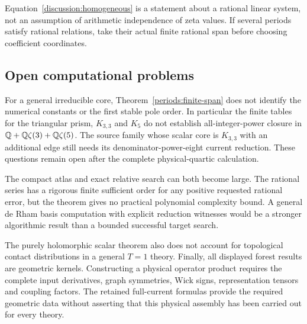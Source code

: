 Equation~\eqref{discussion:homogeneous} is a statement about a
rational linear system, not an assumption of arithmetic
independence of zeta values. If several periods satisfy rational
relations, take their actual finite rational span before choosing
coefficient coordinates.

\subsection{Open computational problems}

For a general irreducible core, Theorem~\ref{periods:finite-span}
does not identify the numerical constants or the first stable
pole order. In particular the finite tables for the triangular
prism, $K_{3,3}$ and $K_5$ do not establish all-integer-power
closure in $\mathbb{Q}+\mathbb{Q}\zeta(3)+\mathbb{Q}\zeta(5)$. The source family whose
scalar core is $K_{3,3}$ with an additional edge still needs its
denominator-power-eight current reduction. These questions remain
open after the complete physical-quartic calculation.

The compact atlas and exact relative search can both become
large. The rational series has a rigorous finite sufficient order
for any positive requested rational error, but the theorem gives
no practical polynomial complexity bound. A general de Rham
basis computation with explicit reduction witnesses would be a
stronger algorithmic result than a bounded successful target
search.

The purely holomorphic scalar theorem also does not account for
topological contact distributions in a general $T=1$ theory.
Finally, all displayed forest results are geometric kernels.
Constructing a physical operator product requires the complete
input derivatives, graph symmetries, Wick signs, representation
tensors and coupling factors. The retained full-current formulas
provide the required geometric data without asserting that
this physical assembly has been carried out for every theory.
